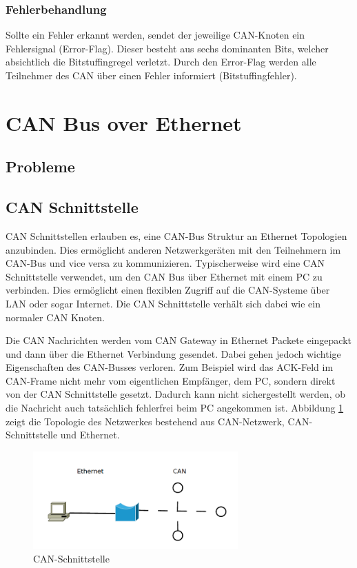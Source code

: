 \subsubsection{Fehlerbehandlung}

Sollte ein Fehler erkannt werden, sendet der jeweilige CAN-Knoten ein Fehlersignal (Error-Flag). Dieser
besteht aus sechs dominanten Bits, welcher absichtlich die Bitstuffingregel verletzt. Durch den Error-Flag
werden alle Teilnehmer des CAN über einen Fehler informiert (Bitstuffingfehler).

\clearpage
\section{CAN Bus over Ethernet}
	
\subsection{Probleme}
	
\subsection{CAN Schnittstelle}

CAN Schnittstellen erlauben es, eine CAN-Bus Struktur an Ethernet Topologien anzubinden. Dies ermöglicht anderen Netzwerkgeräten mit den Teilnehmern im CAN-Bus und vice versa zu kommunizieren. Typischerweise wird eine CAN Schnittstelle verwendet, um den CAN Bus über Ethernet mit einem PC zu verbinden. Dies ermöglicht einen flexiblen Zugriff auf die CAN-Systeme über LAN oder sogar Internet. Die CAN Schnittstelle verhält sich dabei wie ein normaler CAN Knoten. \citep{STE}

Die CAN Nachrichten werden vom CAN Gateway in Ethernet Packete eingepackt und dann über die Ethernet Verbindung gesendet. Dabei gehen jedoch wichtige Eigenschaften des CAN-Busses verloren. Zum Beispiel wird das ACK-Feld im CAN-Frame nicht mehr vom eigentlichen Empfänger, dem PC, sondern direkt von der CAN Schnittstelle gesetzt. Dadurch kann nicht sichergestellt werden, ob die Nachricht auch tatsächlich fehlerfrei beim PC angekommen ist.
Abbildung \ref{gateway} zeigt die Topologie des Netzwerkes bestehend aus CAN-Netzwerk, CAN-Schnittstelle und Ethernet.

\begin{figure}[h] 
\centering
\includegraphics[width=0.7\textwidth]{figures/can_gateway}
\caption{CAN-Schnittstelle} 
\label{gateway}
\end{figure} 

